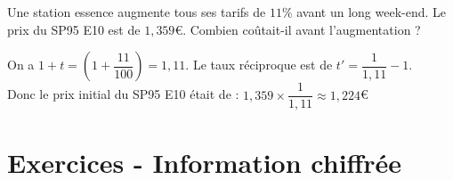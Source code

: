 \begin{Exemple}
Une station essence augmente tous ses tarifs de $11\%$ avant un long week-end. Le prix du SP95 E10 est de $1,359$€. Combien coûtait-il avant l'augmentation ? 

On a $1+t=\left(1+\dfrac{11}{100}\right)=1,11$. Le taux réciproque est de $t'=\dfrac{1}{1,11}-1$. \\
Donc le prix initial du SP95 E10 était de : $1,359\times \dfrac{1}{1,11}\approx 1,224$€
\end{Exemple}

\bigskip

\newpage

\section*{Exercices - Information chiffrée}
